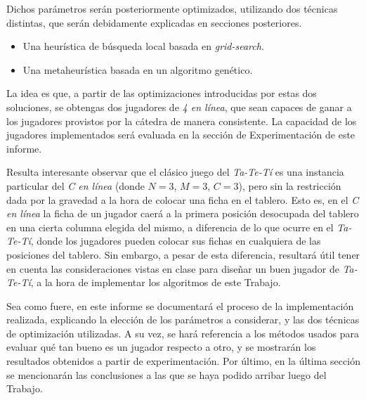 \documentclass[12pt,a4paper]{article}
\begin{document}
    Dichos parámetros serán posteriormente optimizados, utilizando dos técnicas distintas, que serán debidamente explicadas en secciones posteriores.
    \begin{itemize}
        \item Una heurística de búsqueda local basada en \textit{grid-search}.
        \item Una metaheurística basada en un algoritmo genético.
    \end{itemize}
    
    La idea es que, a partir de las optimizaciones introducidas por estas dos soluciones, se obtengas dos jugadores de \textit{4 en línea}, que sean capaces de ganar a los jugadores provistos por la cátedra de manera consistente. La capacidad de los jugadores implementados será evaluada en la sección de Experimentación de este informe.
    
    Resulta interesante observar que el clásico juego del \textit{Ta-Te-Tí} es una instancia particular del \textit{C en línea} (donde $N = 3$, $M = 3$, $C = 3$), pero sin la restricción dada por la gravedad a la hora de colocar una ficha en el tablero. Esto es, en el \textit{C en línea} la ficha de un jugador caerá a la primera posición desocupada del tablero en una cierta columna elegida del mismo, a diferencia de lo que ocurre en el \textit{Ta-Te-Tí}, donde los jugadores pueden colocar sus fichas en cualquiera de las posiciones del tablero. Sin embargo, a pesar de esta diferencia, resultará útil tener en cuenta las consideraciones vistas en clase para diseñar un buen jugador de \textit{Ta-Te-Tí}, a la hora de implementar los algoritmos de este Trabajo.
    
    Sea como fuere, en este informe se documentará el proceso de la implementación realizada, explicando la elección de los parámetros a considerar, y las dos técnicas de optimización utilizadas. A su vez, se hará referencia a los métodos usados para evaluar qué tan bueno es un jugador respecto a otro, y se mostrarán los resultados obtenidos a partir de experimentación. Por último, en la última sección se mencionarán las conclusiones a las que se haya podido arribar luego del Trabajo.
    
    
\end{document}
